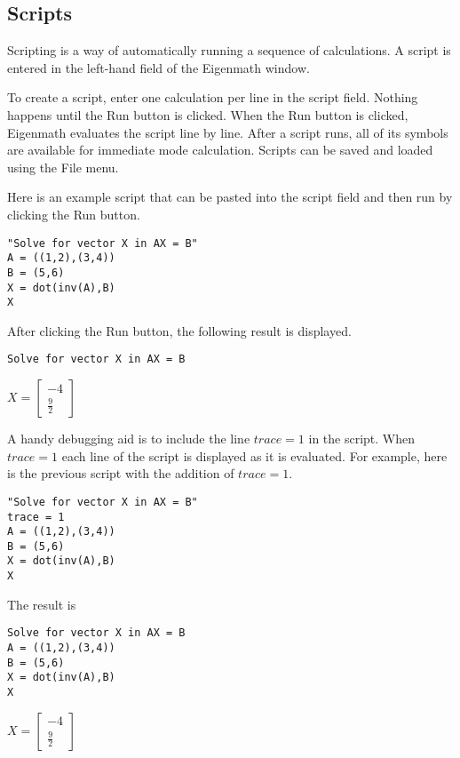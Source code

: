 \subsection{Scripts}

Scripting is a way of automatically running a sequence of calculations.
A script is entered in the left-hand field of the Eigenmath window.

\begin{center}
\end{center}

\noindent
To create a script, enter one calculation per line in the script field.
Nothing happens until the Run button is clicked. When the Run button is
clicked, Eigenmath evaluates the script line by line. After a script runs,
all of its symbols are available for immediate mode calculation.
Scripts can be saved and loaded using the File menu.

\bigskip
\noindent
Here is an example script that can be pasted into the script field
and then run by clicking the Run button.

\begin{Verbatim}[formatcom=\color{blue}]
"Solve for vector X in AX = B"
A = ((1,2),(3,4))
B = (5,6)
X = dot(inv(A),B)
X
\end{Verbatim}

\noindent
After clicking the Run button, the following result is displayed.

\bigskip
\noindent
\verb$Solve for vector X in AX = B$

\bigskip
\noindent
$\displaystyle X=\begin{bmatrix}-4\\ \frac{9}{2}\end{bmatrix}$

\bigskip
\noindent
A handy debugging aid is to include the line $trace=1$ in the script.
When $trace=1$ each line of the script is displayed as it is evaluated.
For example, here is the previous script with the addition of
$trace=1$.

\begin{Verbatim}[formatcom=\color{blue},samepage=true]
"Solve for vector X in AX = B"
trace = 1
A = ((1,2),(3,4))
B = (5,6)
X = dot(inv(A),B)
X
\end{Verbatim}

\noindent
The result is

\begin{Verbatim}
Solve for vector X in AX = B
A = ((1,2),(3,4))
B = (5,6)
X = dot(inv(A),B)
X
\end{Verbatim}

\noindent
$X=\begin{bmatrix}-4\\ \frac{9}{2}\end{bmatrix}$
